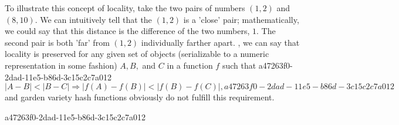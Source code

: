 \documentclass[12pt]{article}
\begin{document}
\par To illustrate this concept of locality, take the two pairs of numbers $(1,2)$ and $(8,10)$. We can intuitively tell that the $(1,2)$ is a 'close' pair; mathematically, we could say that this distance is the difference of the two numbers, $1$. The second pair is both 'far' from $(1,2)$ individually farther apart. , we can say that locality is preserved for any given set of objects (serializable to a numeric representation in some fashion) $A,B,$ and $C$ in a function $f$ such that
a47263f0-2dad-11e5-b86d-3c15c2c7a012\begin{equation}
|A-B| < |B-C| \Rightarrow |f(A)-f(B)| < |f(B) - f(C)|,
a47263f0-2dad-11e5-b86d-3c15c2c7a012\end{equation}
and garden variety hash functions obviously do not fulfill this requirement.

a47263f0-2dad-11e5-b86d-3c15c2c7a012\printbibliography
\end{document}
